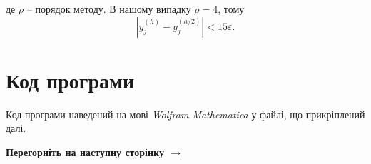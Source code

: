 \documentclass[14pt]{extarticle}
\begin{document}
де $\rho$ -- порядок методу. В нашому випадку $\rho=4$, тому
\begin{equation*}
    \left|y_j^{(h)} - y_j^{(h/2)}\right| < 15\varepsilon.
\end{equation*}

\section{Код програми}
\label{sec:attached-pdf}

Код програми наведений на мові \textit{Wolfram Mathematica} у файлі, 
що прикріплений далі.

\begin{center}
    \textbf{Перегорніть на наступну сторінку $\to$}
\end{center}

\end{document}

